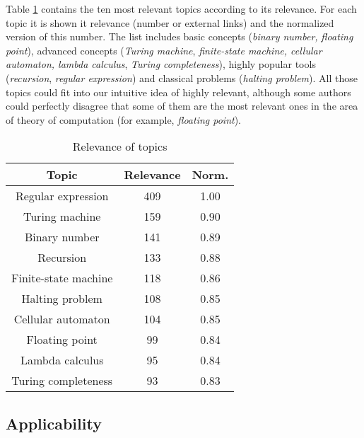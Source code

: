 Table \ref{tab:Relevance-of-Topics} contains the ten most relevant topics according to its relevance. For each topic it is shown it relevance (number or external links) and the normalized version of this number. The list includes basic concepts (\emph{binary number,} \emph{floating point}), advanced concepts (\emph{Turing machine}, \emph{finite-state machine, cellular automaton, lambda calculus}, \emph{Turing completeness}), highly popular tools (\emph{recursion}, \emph{regular expression}) and classical problems (\emph{halting problem}). All those topics could fit into our intuitive idea of highly relevant, although some authors could perfectly disagree that some of them are the most relevant ones in the area of theory of computation (for example, \emph{floating point}).

\begin{table}
\begin{centering}
\begin{tabular}{|c|c|c|}
\hline 
Topic & Relevance & Norm.\tabularnewline
\hline 
\hline 
Regular expression & 409 & 1.00\tabularnewline
\hline 
Turing machine & 159 & 0.90\tabularnewline
\hline 
Binary number & 141 & 0.89\tabularnewline
\hline 
Recursion & 133 & 0.88\tabularnewline
\hline 
Finite-state machine & 118 & 0.86\tabularnewline
\hline 
Halting problem & 108 & 0.85\tabularnewline
\hline 
Cellular automaton & 104 & 0.85\tabularnewline
\hline 
Floating point & 99 & 0.84\tabularnewline
\hline 
Lambda calculus & 95 & 0.84\tabularnewline
\hline 
Turing completeness & 93 & 0.83\tabularnewline
\hline 
\end{tabular}
\par\end{centering}

\caption{\label{tab:Relevance-of-Topics}Relevance of topics}
\end{table}

\subsection{Applicability}

